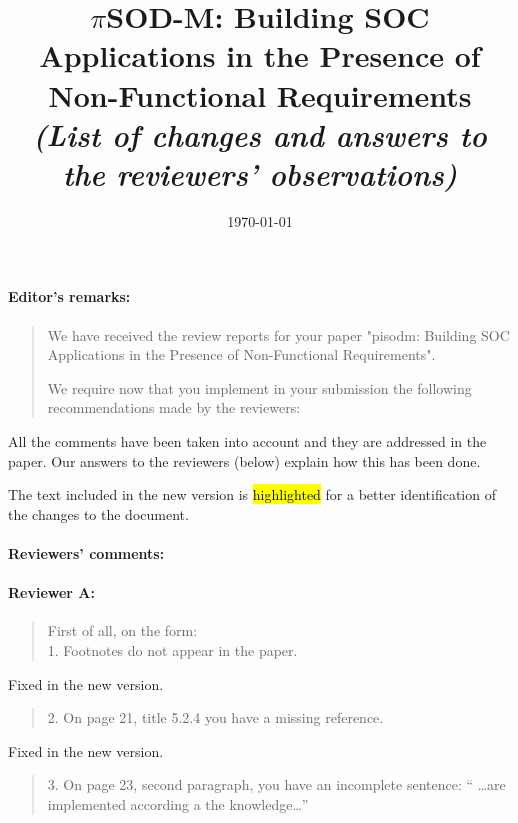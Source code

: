 \documentclass[12pt,a4wide]{article}
\title{$\pi$SOD-M: Building SOC Applications in the Presence of Non-Functional Requirements\\[3mm]
\textit{\large (List of changes and answers to the reviewers' observations)}}
\date{\today}
\begin{document}
\maketitle

\paragraph*{Editor's remarks:}
\begin{quotation}\sf\footnotesize

We have received the review reports for your paper "pisodm: Building SOC Applications in the Presence of Non-Functional Requirements". 

We require now that you implement in your submission the following recommendations made by the reviewers: 


\end{quotation}

\noindent 
All the comments have been taken into account and they are addressed in the paper. 
Our answers to the reviewers (below) explain how this has been done.

The text included in the new version is \hl{highlighted} for a better identification of the changes to the document.

\paragraph*{Reviewers' comments:}

\paragraph*{Reviewer A:} 
\begin{quotation}\sf\footnotesize
\noindent 
First of all, on the form: \\
1.	Footnotes do not appear in the paper. 
\end{quotation}

\noindent 
Fixed in the new version.


\begin{quotation}\sf\footnotesize

2.	On page 21, title 5.2.4 you have a missing reference. 
\end{quotation}

\noindent 
Fixed in the new version.

\begin{quotation}\sf\footnotesize

3.	On page 23, second paragraph, you have an incomplete sentence: `` \dots are implemented according a the knowledge\dots ''
\end{quotation}
\end{document}
